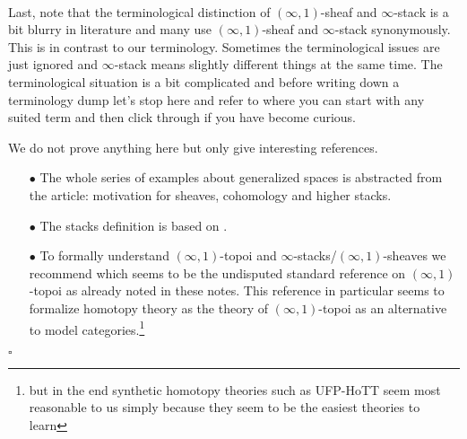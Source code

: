 \begin{exa}
\\
Last, note that the terminological distinction of $(\infty,1)$-sheaf and $\infty$-stack is a bit blurry in literature and many use $(\infty,1)$-sheaf and $\infty$-stack synonymously. This is in contrast to our terminology. Sometimes the terminological issues are just ignored and $\infty$-stack means slightly different things at the same time. The terminological situation is a bit complicated and before writing down a terminology dump let's stop here and refer to \cite{wiki-nlab0000} where you can start with any suited term and then click through if you have become curious.
\end{exa}
\begin{prf}
We do not prove anything here but only give interesting references.
\begin{enumerate}
\item[$\bullet$]
The whole series of examples about generalized spaces is abstracted from the \cite{wiki-nlab0000} article: motivation for sheaves, cohomology and higher stacks.
\item[$\bullet$]
The stacks definition is based on \cite{c82f5e22}.
\item[$\bullet$]
To formally understand $(\infty,1)$-topoi and $\infty$-stacks/$(\infty,1)$-sheaves we recommend \cite{0349e8ea} which seems to be the undisputed standard reference on $(\infty,1)$-topoi as already noted in these notes. This reference in particular seems to formalize homotopy theory as the theory of $(\infty,1)$-topoi as an alternative to model categories.\footnote{but in the end synthetic homotopy theories such as UFP-HoTT seem most reasonable to us simply because they seem to be the easiest theories to learn}
\end{enumerate}
\phantom{proven}
\hfill
$\square$
\end{prf}
